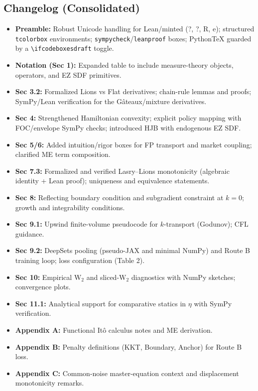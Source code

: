 ﻿\documentclass[11pt,letterpaper,oneside]{article}
\numberwithin{equation}{section}
\newcommand{\1}{\mathbf{1}}
\begin{document}
\subsection*{Changelog (Consolidated)}
\begin{itemize}[leftmargin=1.15em,itemsep=0.25em]
  \item \textbf{Preamble:} Robust Unicode handling for Lean/minted (?, ?, R, e); structured \texttt{tcolorbox} environments; \texttt{sympycheck}/\texttt{leanproof} boxes; PythonTeX guarded by a \texttt{\textbackslash ifcodeboxesdraft} toggle.
  \item \textbf{Notation (Sec 1):} Expanded table to include measure-theory objects, operators, and EZ SDF primitives.
  \item \textbf{Sec 3.2:} Formalized Lions vs Flat derivatives; chain-rule lemmas and proofs; SymPy/Lean verification for the Gâteaux/mixture derivatives.
  \item \textbf{Sec 4:} Strengthened Hamiltonian convexity; explicit policy mapping with FOC/envelope SymPy checks; introduced HJB with endogenous EZ SDF.
  \item \textbf{Sec 5/6:} Added intuition/rigor boxes for FP transport and market coupling; clarified ME term composition.
  \item \textbf{Sec 7.3:} Formalized and verified Lasry–Lions monotonicity (algebraic identity + Lean proof); uniqueness and equivalence statements.
  \item \textbf{Sec 8:} Reflecting boundary condition and subgradient constraint at $k=0$; growth and integrability conditions.
  \item \textbf{Sec 9.1:} Upwind finite-volume pseudocode for $k$-transport (Godunov); CFL guidance.
  \item \textbf{Sec 9.2:} DeepSets pooling (pseudo-JAX and minimal NumPy) and Route B training loop; loss configuration (Table 2).
  \item \textbf{Sec 10:} Empirical $\mathrm W_2$ and sliced-$\mathrm W_2$ diagnostics with NumPy sketches; convergence plots.
  \item \textbf{Sec 11.1:} Analytical support for comparative statics in $\eta$ with SymPy verification.
  \item \textbf{Appendix A:} Functional Itô calculus notes and ME derivation.
  \item \textbf{Appendix B:} Penalty definitions (KKT, Boundary, Anchor) for Route B loss.
  \item \textbf{Appendix C:} Common-noise master-equation context and displacement monotonicity remarks.

\end{itemize}
\end{document}
